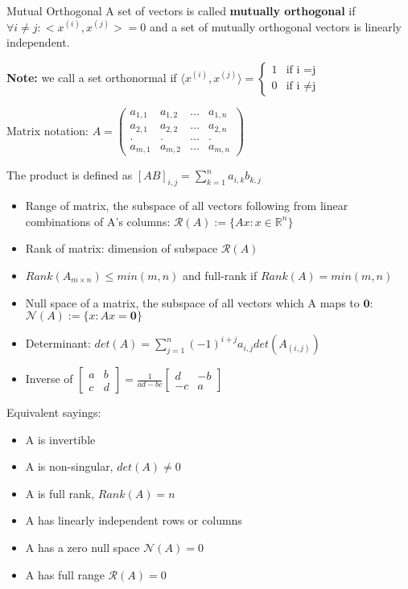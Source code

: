 \documentclass[a4paper]{article}
\begin{document}
\begin{mainbox}{Mutual Orthogonal}
    A set of vectors is called \textbf{mutually orthogonal} if $\forall i \neq j : <x^{(i)}, x^{(j)}> = 0$ and a set of mutually orthogonal vectors is linearly independent.
\end{mainbox}
\textbf{Note:} we call a set orthonormal if $\langle x^{(i)}, x^{(j)}\rangle = \begin{cases}
1 & \text{if i =j}\\
0 & \text{if i } \neq \text{j}
\end{cases}$  

Matrix notation:
$A= \left( \begin{smallmatrix} a_{1,1} & a_{1,2} & \dots & a_{1,n} \\
a_{2,1} & a_{2,2} & \dots & a_{2,n} \\
. & . & \dots & .\\
a_{m,1} & a_{m,2} & \dots & a_{m,n} \end{smallmatrix} \right)$ 

The product is defined as $\left[AB\right]_{i,j} = \sum_{k=1}^{n} a_{i,k}b_{k,j}$ 

\begin{itemize}
    \item Range of matrix, the subspace of all vectors following from linear combinations of A's columns: $\mathcal{R}(A) := \{Ax : x\in\mathbb{R}^n \}$
    \item Rank of matrix: dimension of subspace $\mathcal{R}(A)$
    \item $Rank(A_{m\times n}) \leq min(m,n)$ and full-rank if $Rank(A) = min(m,n)$
    \item Null space of a matrix, the subspace of all vectors which A maps to $\mathbf{0}$: $\mathcal{N}(A) := \{x: Ax =\mathbf{0}\}$
    \item Determinant: $det(A) = \sum_{j=1}^{n} (-1)^{i+j}a_{i,j}det(A_{(i,j)})$ 
    \item Inverse of $\left[\begin{smallmatrix} a & b \\ c & d  \end{smallmatrix} \right] = \frac{1}{ad-bc}\left[\begin{smallmatrix} d& -b \\ -c & a  \end{smallmatrix} \right]$     
\end{itemize}

Equivalent sayings:
\begin{itemize}
    \item A is invertible
    \item A is non-singular, $det(A) \neq 0$ 
    \item A is full rank, $Rank(A) = n$
    \item A has linearly independent rows or columns
    \item A has a zero null space $\mathcal{N}(A) = 0$
    \item A has full range $\mathcal{R}(A) = 0$   
\end{itemize}
\end{document}
